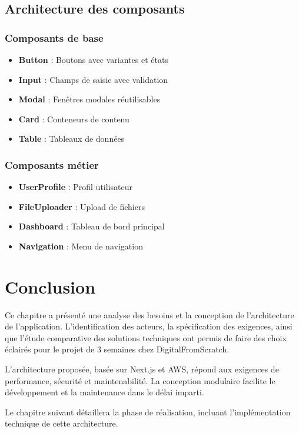 \subsection{Architecture des composants}

\subsubsection{Composants de base}

\begin{itemize}
    \item \textbf{Button} : Boutons avec variantes et états
    \item \textbf{Input} : Champs de saisie avec validation
    \item \textbf{Modal} : Fenêtres modales réutilisables
    \item \textbf{Card} : Conteneurs de contenu
    \item \textbf{Table} : Tableaux de données
\end{itemize}

\subsubsection{Composants métier}

\begin{itemize}
    \item \textbf{UserProfile} : Profil utilisateur
    \item \textbf{FileUploader} : Upload de fichiers
    \item \textbf{Dashboard} : Tableau de bord principal
    \item \textbf{Navigation} : Menu de navigation
\end{itemize}

\section{Conclusion}

Ce chapitre a présenté une analyse des besoins et la conception de l'architecture de l'application. L'identification des acteurs, la spécification des exigences, ainsi que l'étude comparative des solutions techniques ont permis de faire des choix éclairés pour le projet de 3 semaines chez DigitalFromScratch.

L'architecture proposée, basée sur Next.js et AWS, répond aux exigences de performance, sécurité et maintenabilité. La conception modulaire facilite le développement et la maintenance dans le délai imparti.

Le chapitre suivant détaillera la phase de réalisation, incluant l'implémentation technique de cette architecture.
